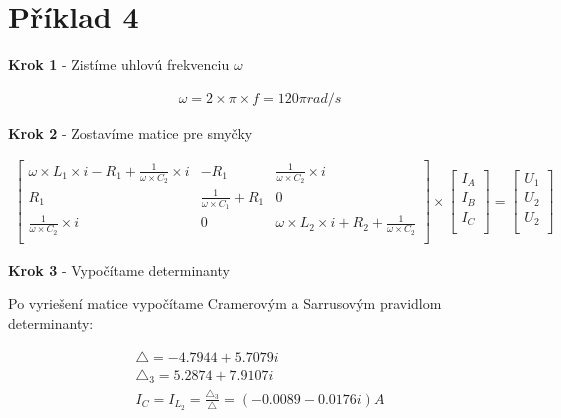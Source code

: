 \section{Příklad 4}

\begin{center}
    \textbf{Krok 1} - Zistíme uhlovú frekvenciu $\omega$
\end{center}

\begin{gather*}
    \omega = 2 \times \pi \times f = 120\pi rad/s
\end{gather*}

\begin{center}
    \textbf{Krok 2} - Zostavíme matice pre smyčky
\end{center}

\begin{gather*}
    \begin{bmatrix} 
	\omega \times L_{1} \times i - R_{1} + \frac{1}{\omega \times C_{2}} \times i & -R_{1} & \frac{1}{\omega \times C_{2}} \times i \\
	R_{1} & \frac{1}{\omega \times C_{1}} + R_{1} & 0\\
	\frac{1}{\omega \times C_{2}} \times i & 0 & \omega \times L_{2} \times i + R_{2} + \frac{1}{\omega \times C_{2}}\\
	\end{bmatrix}
    \times
    \begin{bmatrix}
    I_{A}\\
    I_{B}\\
    I_{C}\\
    \end{bmatrix}
    =
    \begin{bmatrix}
    U_{1}\\
    U_{2}\\
    U_{2}\\
    \end{bmatrix}
	\quad
\end{gather*}

\begin{center}
    \textbf{Krok 3} - Vypočítame determinanty

    Po vyriešení matice vypočítame Cramerovým a Sarrusovým pravidlom determinanty:
\end{center}

\begin{gather*}
    \triangle = -4.7944 + 5.7079i\\
    \triangle_{3} = 5.2874 + 7.9107i\\
    I_{C} = I_{L_{2}} = \frac{\triangle_{3}}{\triangle} = (-0.0089 - 0.0176i)A\\
\end{gather*}
\newpage


